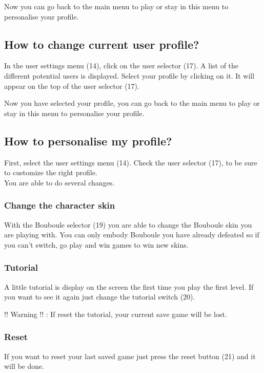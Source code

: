 \documentclass[a4paper,10pt]{report}
\begin{document}
Now you can go back to the main menu to play or stay in this menu to personalise your profile.

	\subsection*{How to change current user profile?}
	
In the user settings menu (14), click on the user selector (17). A list of the different potential users is displayed. Select your profile by clicking on it. It will appear on the top of the user selector (17).

Now you have selected your profile, you can go back to the main menu to play or stay in this menu to personalise your profile.

	\subsection*{How to personalise my profile?}

First, select the user settings menu (14). Check the user selector (17), to be sure to customize the right profile.\\
You are able to do several changes.

		\subsubsection*{Change the character skin}

With the Bouboule selector (19) you are able to change the Bouboule skin you are playing with. You can only embody Bouboule you have already defeated so if you can't switch, go play and win games to win new skins.

		\subsubsection*{Tutorial}

A little tutorial is display on the screen the first time you play the first level. If you want to see it again just change the tutorial switch (20).

!! Warning !! : If reset the tutorial, your current save game will be lost.

		\subsubsection*{Reset}
		
If you want to reset your last saved game just press the reset button (21) and it will be done.
\end{document}
